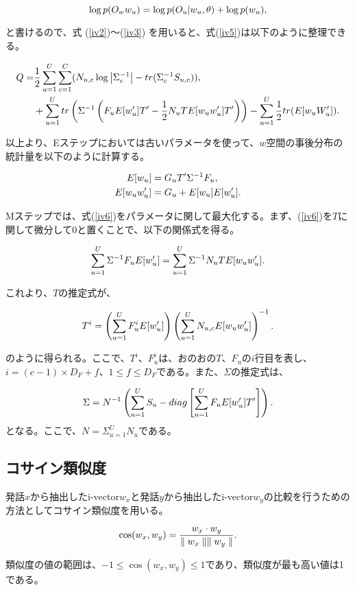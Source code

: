 \begin{equation}
\log p(O_w w_u)=\log p(O_u|w_u,\theta)+\log p(w_u), \notag
\end{equation}

と書けるので、式 (\ref{iv2})〜(\ref{iv3}) を用いると、式(\ref{iv5})は以下のように整理できる。

\begin{align}
Q=&\frac{1}{2}\sum_{u=1}^{U}\sum_{c=1}^{C}(N_{u,c} \log\left|\Sigma_c^{-1}\right|-tr(\Sigma_c^{-1}S_{u,c})), \notag  \\
&+\sum_{u=1}^{U}tr\left( \Sigma^{-1}\left( F_uE[w_u^\prime]T^\prime -\frac{1}{2}N_uTE[w_uw_u^\prime]T^\prime \right) \right) -\sum_{u=1}^{U}\frac{1}{2}tr(E[w_uW_u^\prime]). \label{iv6}
\end{align}

以上より、Eステップにおいては古いパラメータを使って、$w$空間の事後分布の統計量を以下のように計算する。

\begin{align}
E[w_u] &=G_uT^\prime\Sigma^{-1}F_u, \notag \\
E[w_uw_u^\prime] &=G_u+E[w_u]E[w_u^\prime]. \notag
\end{align}

Mステップでは、式(\ref{iv6})をパラメータに関して最大化する。まず、(\ref{iv6})を$T$に関して微分して0と置くことで、以下の関係式を得る。

\begin{equation}
\sum_{u=1}^{U}\Sigma^{-1}F_uE[w_u^\prime]=\sum_{u=1}^{U}\Sigma^{-1}N_uTE[w_uw_u^\prime]. \notag
\end{equation}

これより、$T$の推定式が、

\begin{equation}
T^i=\left(\sum_{u=1}^{U}F_u^iE[w_u^\prime] \right)\left(\sum_{u=1}^{U}N_{u,c}E[w_uw_u^\prime] \right)^{-1}. \notag
\end{equation}

のように得られる。ここで、$T^i$、$F_u^i$は、おのおの$T$、$F_u$の$i$行目を表し、$i=(c-1)\times D_F+f$、$1\leq f\leq D_F$である。また、$\Sigma$の推定式は、

\begin{equation}
\Sigma=N^{-1}\left(\sum_{u=1}^{U}S_u-diag\left[\sum_{u=1}^{U}F_uE[w_u^\prime]T^\prime \right] \right). \notag
\end{equation}
となる。ここで、$N=\Sigma_{u=1}^{U}N_u$である。

\subsection{コサイン類似度}
発話$x$から抽出したi-vector$w_x$と発話$y$から抽出したi-vector$w_y$の比較を行うための方法としてコサイン類似度を用いる。

\begin{equation}
\cos(w_x,w_y)=\frac{w_x\cdot w_y}{\parallel w_x\parallel\parallel w_y\parallel}. \notag
\end{equation}

類似度の値の範囲は、$-1\leq \cos(w_x,w_y)\leq 1$であり、類似度が最も高い値は1である。

